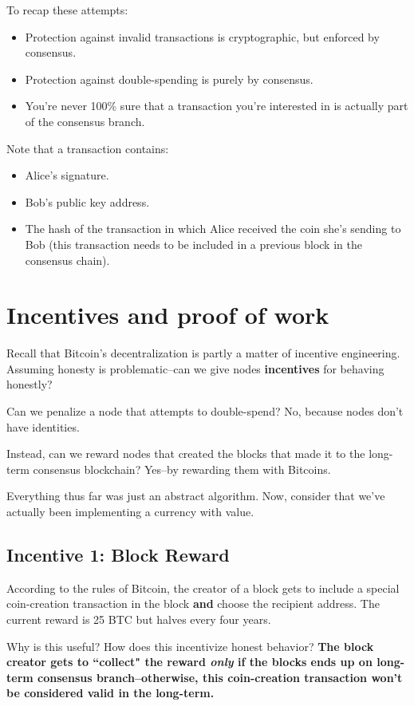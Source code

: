 \documentclass[12pt]{article}
\begin{document}
To recap these attempts:
\begin{itemize}
\item Protection against invalid transactions is cryptographic, but enforced by consensus. \item Protection against double-spending is purely by consensus.
\item You're never 100\% sure that a transaction you're interested in is actually part of the consensus branch.
\end{itemize}

Note that a transaction contains:
\begin{itemize}
\item Alice's signature.
\item Bob's public key address.
\item The hash of the transaction in which Alice received the coin she's sending to Bob (this transaction needs to be included in a previous block in the consensus chain).
\end{itemize}

\section*{Incentives and proof of work}

Recall that Bitcoin's decentralization is partly a matter of incentive engineering. Assuming honesty is problematic--can we give nodes \textbf{incentives} for behaving honestly?

Can we penalize a node that attempts to double-spend? No, because nodes don't have identities.

Instead, can we reward nodes that created the blocks that made it to the long-term consensus blockchain? Yes--by rewarding them with Bitcoins.

Everything thus far was just an abstract algorithm. Now, consider that we've actually been implementing a currency with value. 

\subsection*{Incentive 1: Block Reward}

According to the rules of Bitcoin, the creator of a block gets to include a special coin-creation transaction in the block \textbf{and} choose the recipient address. The current reward is 25 BTC but halves every four years.

Why is this useful? How does this incentivize honest behavior? \textbf{The block creator gets to ``collect" the reward \textit{only} if the blocks ends up on long-term consensus branch--otherwise, this coin-creation transaction won't be considered valid in the long-term.}
\end{document}
